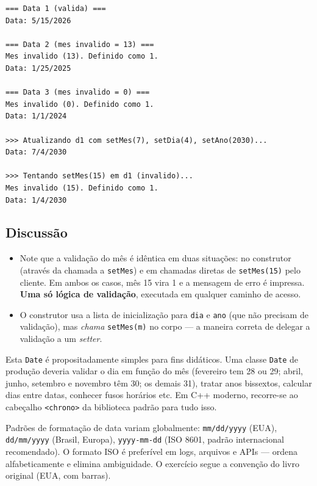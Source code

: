 \documentclass[11pt,a4paper]{article}
\begin{document}
\begin{saidabox}
\begin{lstlisting}[style=terminal]
=== Data 1 (valida) ===
Data: 5/15/2026

=== Data 2 (mes invalido = 13) ===
Mes invalido (13). Definido como 1.
Data: 1/25/2025

=== Data 3 (mes invalido = 0) ===
Mes invalido (0). Definido como 1.
Data: 1/1/2024

>>> Atualizando d1 com setMes(7), setDia(4), setAno(2030)...
Data: 7/4/2030

>>> Tentando setMes(15) em d1 (invalido)...
Mes invalido (15). Definido como 1.
Data: 1/4/2030
\end{lstlisting}
\end{saidabox}

\subsection*{Discuss\~ao}

\begin{itemize}[leftmargin=*]
  \item Note que a valida\c{c}\~ao do m\^es \'e id\^entica em duas situa\c{c}\~oes: no construtor (atrav\'es da chamada a \texttt{setMes}) e em chamadas diretas de \texttt{setMes(15)} pelo cliente. Em ambos os casos, m\^es 15 vira 1 e a mensagem de erro \'e impressa. \textbf{Uma s\'o l\'ogica de valida\c{c}\~ao}, executada em qualquer caminho de acesso.
  \item O construtor usa a lista de inicializa\c{c}\~ao para \texttt{dia} e \texttt{ano} (que n\~ao precisam de valida\c{c}\~ao), mas \emph{chama} \texttt{setMes(m)} no corpo --- a maneira correta de delegar a valida\c{c}\~ao a um \emph{setter}.
\end{itemize}

\begin{obseng}
Esta \texttt{Date} \'e propositadamente simples para fins did\'aticos. Uma classe \texttt{Date} de produ\c{c}\~ao deveria validar o dia em fun\c{c}\~ao do m\^es (fevereiro tem 28 ou 29; abril, junho, setembro e novembro t\^em 30; os demais 31), tratar anos bissextos, calcular dias entre datas, conhecer fusos hor\'arios etc. Em C++ moderno, recorre-se ao cabe\c{c}alho \texttt{<chrono>} da biblioteca padr\~ao para tudo isso.
\end{obseng}

\begin{boaprat}
Padr\~oes de formata\c{c}\~ao de data variam globalmente: \texttt{mm/dd/yyyy} (EUA), \texttt{dd/mm/yyyy} (Brasil, Europa), \texttt{yyyy-mm-dd} (ISO 8601, padr\~ao internacional recomendado). O formato ISO \'e prefer\'ivel em logs, arquivos e APIs --- ordena alfabeticamente e elimina ambiguidade. O exerc\'icio segue a conven\c{c}\~ao do livro original (EUA, com barras).
\end{boaprat}
\end{document}
